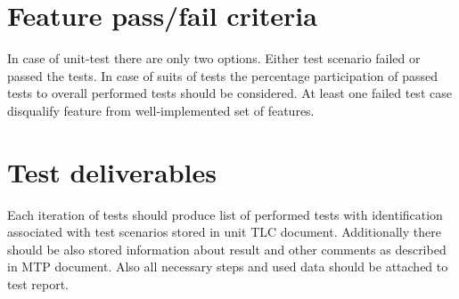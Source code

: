 \section{Feature pass/fail criteria} \label{s:details-of-the-level-test-design:feature-pass-fail-criteria}
	\begin{comment}
		Specify the criteria to be used to determine whether the feature or feature combination has passed or
		failed. This is commonly based on the number of anomalies found in each severity category(s). This
		section is not needed if it is covered by an MTP and there have been no subsequent changes to the
		criteria.
	\end{comment}
	In case of unit-test there are only two options. Either test scenario failed or passed the tests. In case of suits of tests the percentage participation of passed tests to overall performed tests should be considered. At least one failed test case disqualify feature from well-implemented set of features. 
\section{Test deliverables} \label{s:details-of-the-level-test-design:test-deliverables}
	\begin{comment}
		Identify all information that is to be delivered by the test activity (documents, data, etc.). The following
		documents may be included:
		⎯ Level Test Plan(s)
		⎯ Level Test Design(s)
		⎯ Level Test Cases
		⎯ Level Test Procedures
		⎯ Level Test Logs
		⎯ Anomaly Reports
		⎯ Level Interim Test Status Report(s)
		⎯ Level Test Report(s)
		⎯ Master Test Report
		Test input data and test output data may be identified as deliverables. Test tools may also be included.
		If documents have been combined or eliminated, then this list will be modified accordingly.
		Describe the process of delivering the completed information to the individuals (preferably by position,
		not name) and organizational entities that will need it. This may be a reference to a Configuration
		Management Plan. This delivery process description is not required if it is covered by the MTP and
		there are no changes
	\end{comment}
	Each iteration of tests should produce list of performed tests with identification associated with test scenarios stored in unit \gls{TLC} document. Additionally there should be also stored information about result and other comments as described in \gls{MTP} document. Also all necessary steps and used data should be attached to test report.
